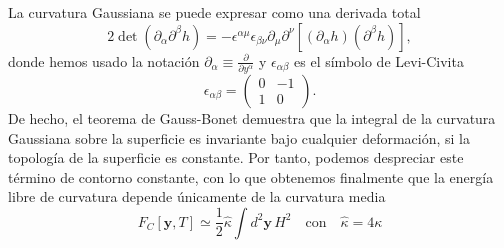 La curvatura Gaussiana se puede expresar como una derivada total \cite{David:normal}
\begin{equation*}
2\det(\partial_{\alpha}\partial^{\beta}h)=
-\epsilon^{\alpha\mu}\epsilon_{\beta\nu}\partial_{\mu}\partial^{\nu}[(\partial_{\alpha}h)(\partial^{\beta}h)],
\end{equation*}
donde hemos usado la notación $\partial_{\alpha}\equiv\frac{\partial}{\partial
  y^{\alpha}}$ y $\epsilon_{\alpha\beta}$ es el símbolo de Levi-Civita
\begin{equation*}
\epsilon_{\alpha\beta}=\left(\begin{array}{cc}
0 & -1\\
1 & 0
\end{array}\right).
\end{equation*}
De hecho, el teorema de Gauss-Bonet\cite{David:geometria} demuestra que la integral de la curvatura
Gaussiana sobre la superficie es invariante bajo cualquier deformación, si la
topología de la superficie es constante. Por tanto, podemos despreciar este
término de contorno constante, con lo que obtenemos finalmente que la energía
libre de curvatura depende únicamente de la curvatura media 
\begin{equation}\label{ELandau_curvatura2}
F_C[\mathbf{y},T]\simeq\frac{1}{2}\hat{\kappa}\int d^2\mathbf{y}\, H^2 \quad
\text{con} \quad \hat{\kappa}=4\kappa
\end{equation} 

